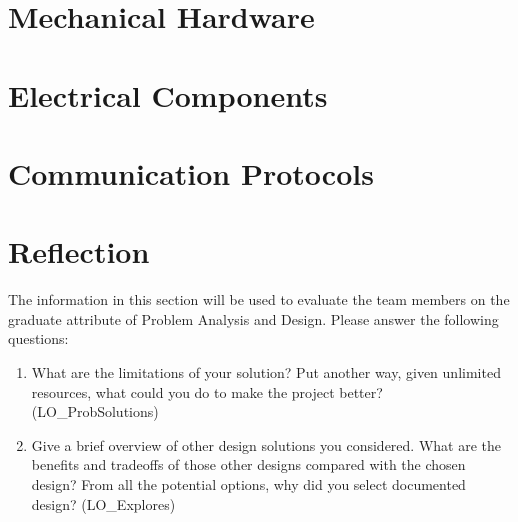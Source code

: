 \documentclass[12pt, titlepage]{article}
\begin{document}
	\section{Mechanical Hardware}
	
	\section{Electrical Components}
	
	\section{Communication Protocols}
	
	\section{Reflection}
	
	The information in this section will be used to evaluate the team members on the
	graduate attribute of Problem Analysis and Design.  Please answer the following questions:
	
	\begin{enumerate}
		\item What are the limitations of your solution?  Put another way, given
		unlimited resources, what could you do to make the project better? (LO\_ProbSolutions)
		\item Give a brief overview of other design solutions you considered.  What
		are the benefits and tradeoffs of those other designs compared with the chosen
		design?  From all the potential options, why did you select documented design?
		(LO\_Explores)
	\end{enumerate}
	
\end{document}
